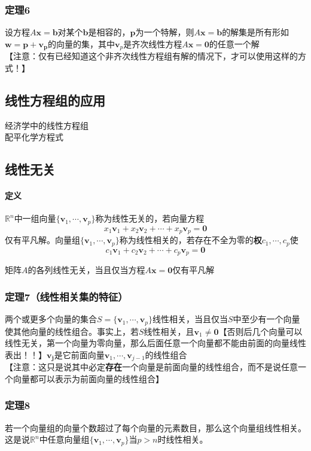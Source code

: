 \documentclass{article}
\newcommand{\ve}{\boldsymbol}
\begin{document}
\begin{CJK}{UTF8}{gkai}
\subsubsection{定理6}
设方程$A\ve{x}=\ve{b}$对某个$\ve{b}$是相容的，$\ve{p}$为一个特解，则$A\ve{x}=\ve{b}$的解集是所有形如$\ve{w}=\ve{p}+\ve{v_p}$的向量的集，其中$\ve{v}_p$是齐次线性方程$A\ve{x}=\ve{0}$的任意一个解\\
【注意：仅有已经知道这个非齐次线性方程组有解的情况下，才可以使用这样的方式！】\\
\subsection{线性方程组的应用}
经济学中的线性方程组\\
配平化学方程式\\
\subsection{线性无关}
\paragraph{定义\\}
$\mathbb{R}^n$中一组向量$\{\ve{v}_1,\cdots,\ve{v}_p\}$称为线性无关的，若向量方程
\[x_1\ve{v}_1+x_2\ve{v}_2+\cdots+x_p\ve{v}_p=\ve{0}\]
仅有平凡解。向量组$\{\ve{v}_1,\cdots,\ve{v}_p\}$称为线性相关的，若存在不全为零的\textbf{权}$c_1,\cdots,c_p$使\\
\[c_1\ve{v}_1+c_2\ve{v}_2+\cdots+c_p\ve{v}_p=\ve{0}\]

矩阵$A$的各列线性无关，当且仅当方程$A\ve{x}=\ve{0}$仅有平凡解\\

\subsubsection{定理7（线性相关集的特征）}
两个或更多个向量的集合$S=\{\ve{v}_1,\cdots,\ve{v}_p\}$线性相关，当且仅当$S$中至少有一个向量使其他向量的线性组合。事实上，若$S$线性相关，且$\ve{v}_1\neq\ve{0}$【否则后几个向量可以线性无关，第一个向量为零向量，那么后面任意一个向量都不能由前面的向量线性表出！！】$\ve{v_j}$是它前面向量$\ve{v}_1,\cdots,\ve{v}_{j-1}$的线性组合\\

【注意：这只是说其中必定\textbf{存在}一个向量是前面向量的线性组合，而不是说任意一个向量都可以表示为前面向量的线性组合】\\

\subsubsection{定理8}
若一个向量组的向量个数超过了每个向量的元素数目，那么这个向量组线性相关。这是说$\mathbb{R}^n$中任意向量组$\{\ve{v}_1,\cdots,\ve{v}_p\}$当$p>n$时线性相关。\\

\end{CJK}
\end{document}
